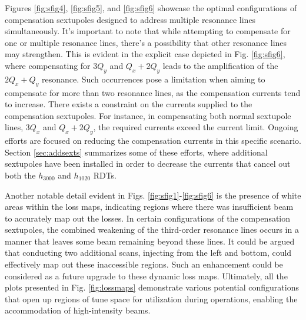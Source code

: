 Figures \ref{fig:sfig4}, \ref{fig:sfig5}, and \ref{fig:sfig6} showcase the optimal configurations of compensation sextupoles designed to address multiple resonance lines simultaneously. It's important to note that while attempting to compensate for one or multiple resonance lines, there's a possibility that other resonance lines may strengthen. This is evident in the explicit case depicted in Fig. \ref{fig:sfig6}, where compensating for $3Q_y$ and $Q_x+2Q_y$ leads to the amplification of the $2Q_x+Q_y$ resonance. Such occurrences pose a limitation when aiming to compensate for more than two resonance lines, as the compensation currents tend to increase. There exists a constraint on the currents supplied to the compensation sextupoles. For instance, in compensating both normal sextupole lines, $3Q_x$ and $Q_x+2Q_y$, the required currents exceed the current limit. Ongoing efforts are focused on reducing the compensation currents in this specific scenario. Section \ref{sec:addsexts} summarizes some of these efforts, where additional sextupoles have been installed in order to decrease the currents that cancel out both the $h_{3000}$ and $h_{1020}$ RDTs.

Another notable detail evident in Figs. \ref{fig:sfig1}-\ref{fig:sfig6} is the presence of white areas within the loss maps, indicating regions where there was insufficient beam to accurately map out the losses. In certain configurations of the compensation sextupoles, the combined weakening of the third-order resonance lines occurs in a manner that leaves some beam remaining beyond these lines. It could be argued that conducting two additional scans, injecting from the left and bottom, could effectively map out these inaccessible regions. Such an enhancement could be considered as a future upgrade to these dynamic loss maps. Ultimately, all the plots presented in Fig. \ref{fig:lossmaps} demonstrate various potential configurations that open up regions of tune space for utilization during operations, enabling the accommodation of high-intensity beams.

